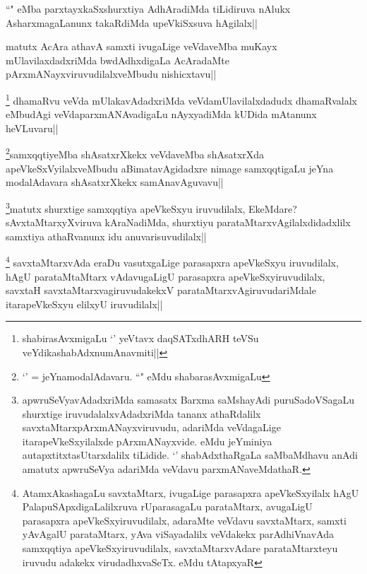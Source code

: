 
\begin{artha}
``\stext" eMba parxtayxkaSxshurxtiya AdhAradiMda tiLidiruva nAlukx AsharxmagaLanunx takaRdiMda upeVkiSxsuva hAgilalx||
\end{artha}

\begin{artha}
matutx AcAra athavA samxti ivugaLige veVdaveMba muKayx mUlavilaxdadxriMda bwdAdhxdigaLa AcAradaMte pArxmANayxviruvudilalxveMbudu nishicxtavu||
\end{artha}


\begin{artha}
\footnote{shabirasAvxmigaLu `\stext' yeVtavx daqSATxdhARH teVSu  veYdikashabAdxnumAnavmiti||} dhamaRvu veVda mUlakavAdadxriMda veVdamUlavilalxdadudx dhamaRvalalx eMbudAgi veVdaparxmANAvadigaLu nAyxyadiMda kUDida mAtanunx heVLuvaru||
\end{artha}

\begin{artha}
\footnote{`\stext' = jeYnamodalAdavaru. ``\stext" eMdu shabarasAvxmigaLu}samxqqtiyeMba shAsatxrXkekx veVdaveMba shAsatxrXda apeVkeSxVyilalxveMbudu aBimatavAgidadxre nimage samxqqtigaLu jeYna modalAdavara shAsatxrXkekx samAnavAguvavu||
\end{artha}

\begin{artha}
\footnote{apwruSeVyavAdadxriMda samasatx Barxma saMshayAdi puruSadoVSagaLu shurxtige iruvudalalxvAdadxriMda tananx athaRdalilx savxtaMtarxpArxmANayxviruvudu, adariMda veVdagaLige itarapeVkeSxyilalxde pArxmANayxvide. eMdu jeYminiya autapxtitxtasUtarxdalilx tiLidide. `\stext' shabAdxthaRgaLa saMbaMdhavu anAdi amatutx apwruSeVya adariMda veVdavu parxmANaveMdathaR.}matutx shurxtige samxqqtiya apeVkeSxyu iruvudilalx, EkeMdare? sAvxtaMtarxyXviruva kAraNadiMda, shurxtiyu parataMtarxvAgilalxdidadxlilx samxtiya athaRvanunx idu anuvarisuvudilalx||
\end{artha}

\begin{artha}
\footnote{AtamxAkashagaLu savxtaMtarx, ivugaLige parasapxra apeVkeSxyilalx hAgU PalapuSApxdigaLalilxruva rUparasagaLu parataMtarx, avugaLigU parasapxra apeVkeSxyiruvudilalx, adaraMte veVdavu savxtaMtarx, samxti yAvAgalU parataMtarx, yAva viSayadalilx veVdakekx parAdhiVnavAda samxqqtiya apeVkeSxyiruvudilalx, savxtaMtarxvAdare parataMtarxteyu iruvudu adakekx virudadhxvaSeTx. eMdu tAtapxyaR} savxtaMtarxvAda eraDu vasutxgaLige parasapxra apeVkeSxyu iruvudilalx, hAgU parataMtaMtarx vAdavugaLigU parasapxra apeVkeSxyiruvudilalx, savxtaH savxtaMtarxvagiruvudakekxV parataMtarxvAgiruvudariMdale itarapeVkeSxyu elilxyU iruvudilalx||
\end{artha}

